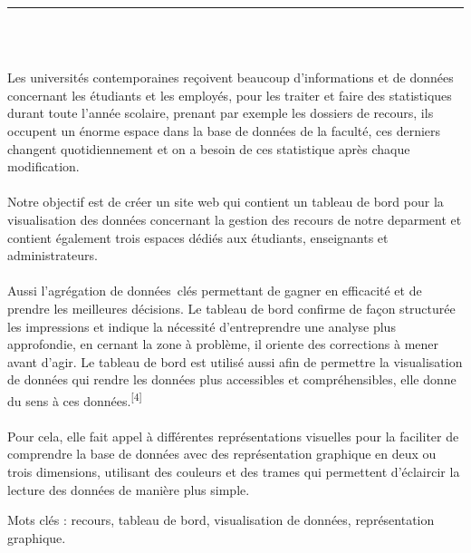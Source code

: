 \documentclass[12pt]{report}
\newenvironment{changemargin}[2]{%
\begin{list}{}{%
\setlength{\topsep}{0pt}%
\setlength{\leftmargin}{#1}%
\setlength{\rightmargin}{#2}%
\setlength{\listparindent}{\parindent}%
\setlength{\itemindent}{\parindent}%
\setlength{\parsep}{\parskip}%
}%
\item[]}{\end{list}}
\begin{document}
\begin{center}
    {\color{Blue} \rule{3in}{1.4mm} }\\
    \vspace{0.1in}
    \scshape{\fontsize{34}{46}{\bfseries{\color{Blue}{Résumé}}}}
    \\
    \vspace{0.6in}
\end{center}
\begin{changemargin}{0.9cm}{0.9cm}
Les universités contemporaines reçoivent beaucoup d’informations et de données concernant les étudiants et les employés, pour les traiter et faire des statistiques durant toute l’année scolaire, prenant par exemple les dossiers de recours, ils occupent un énorme espace dans la base de données de la faculté, ces derniers changent quotidiennement et on a besoin de ces statistique après chaque modification.
\\\\
Notre objectif est de créer un site web qui contient un tableau de bord pour la visualisation des données concernant la gestion des recours de notre deparment et contient également trois espaces dédiés aux étudiants, enseignants et administrateurs.
\\\\
  Aussi l’agrégation de données clés permettant de gagner en efficacité et de prendre les meilleures décisions. Le tableau de bord confirme de façon structurée les impressions et  indique la nécessité d’entreprendre une analyse plus approfondie, en cernant la zone à problème, il oriente des corrections à mener avant d’agir. Le tableau de bord est utilisé aussi afin de permettre la visualisation de données qui rendre les données plus accessibles et compréhensibles, elle donne du sens à ces données.\textsuperscript{[4]}
\\\\
Pour cela, elle fait appel à différentes représentations visuelles pour la faciliter de comprendre la base de données avec des représentation graphique en deux ou trois dimensions, utilisant des couleurs et des trames qui permettent d'éclaircir la lecture des données de manière plus simple.
\end{changemargin}

\vspace{1in}

\begin{changemargin}{0.9cm}{0.9cm}
Mots clés : recours, tableau de bord, visualisation de données, représentation graphique.
\end{changemargin}
\end{document}

